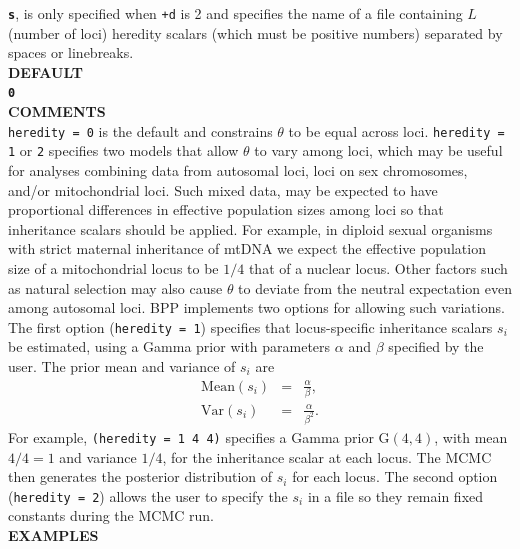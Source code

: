 \documentclass{book}
\numberwithin{equation}{section} \renewcommand{\baselinestretch}{0.55}
\begin{document}
\textbf{\texttt{s}}, is only specified when \texttt{+d} is 2 and
specifies the name of a file containing $L$ (number of loci) heredity
scalars (which must be positive numbers) separated by spaces or
linebreaks.
\vspace{5pt}\\
\textbf{DEFAULT} \vspace{5pt}\\
\textbf{\texttt{0}} \vspace{5pt}\\
\textbf{COMMENTS} \vspace{5pt}\\
\texttt{heredity = 0} is the default and constrains $\theta$ to be
equal across loci. \texttt{heredity = 1} or \texttt{2} specifies two
models that allow $\theta$ to vary among loci, which may be useful for
analyses combining data from autosomal loci, loci on sex chromosomes,
and/or mitochondrial loci. Such mixed data, may be expected to have
proportional differences in effective population sizes among loci so
that inheritance scalars \citep[][]{Hey2004} should be applied.  For
example, in diploid sexual organisms with strict maternal inheritance
of mtDNA we expect the effective population size of a mitochondrial
locus to be $1/4$ that of a nuclear locus.  Other factors such as
natural selection may also cause $\theta$ to deviate from the neutral
expectation even among autosomal loci.  \textsc{BPP} implements two
options for allowing such variations.  The first option
(\texttt{heredity = 1}) specifies that locus-specific inheritance
scalars $s_i$ be estimated, using a Gamma prior with parameters
$\alpha$ and $\beta$ specified by the user. The prior mean and
variance of $s_i$ are
\begin{eqnarray}
  \textrm{Mean}(s_i) & = & \frac{\alpha}{\beta}, \nonumber \\
  \textrm{Var}(s_i) & = & \frac{\alpha}{\beta^2}. \nonumber 
\end{eqnarray}
For example, \texttt{(heredity = 1 4 4)} specifies a Gamma prior
$\textrm{G}(4, 4)$, with mean $4/4 = 1$ and variance $1/4$, for the
inheritance scalar at each locus.  The MCMC then generates the
posterior distribution of $s_i$ for each locus. The second option
(\texttt{heredity = 2}) allows the user to specify the $s_i$ in a file
so they remain fixed constants during the MCMC run.
\vspace{5pt}\\
\textbf{EXAMPLES} \vspace{5pt}\\
\end{document}
